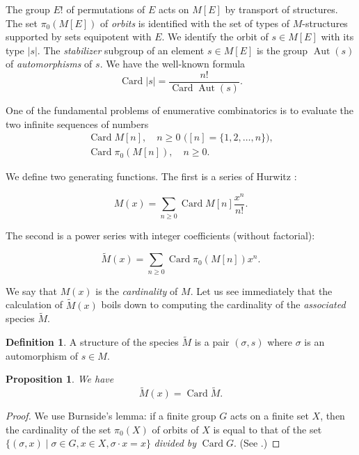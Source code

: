 \documentclass{amsart}
\newtheorem{prop}[thm]{Proposition}
\theoremstyle{definition}
\newtheorem{defn}[thm]{Definition}
\theoremstyle{remark}
\DeclareMathOperator{\Card}{Card}
\DeclareMathOperator{\Aut}{Aut}
\newcommand{\unl}[1]{\tilde{#1}}
\begin{document}
\subsubsection{}
The group $E!$ of permutations of $E$ acts on $M [E]$ by transport
of structures. The set $\pi_0 (M [E])$ of \emph{orbits} is identified
with the set of types of $M$-structures supported by sets equipotent
with $E$. We identify the orbit of $s \in M[E]$ with its type
$|s|$. The \emph{stabilizer} subgroup of an element $s \in M [E]$ is
the group $\Aut (s)$ of \emph{automorphisms} of $s$. We have the
well-known formula \[ \Card |s| = \frac{n!}{\Card \Aut(s)}. \]

One of the fundamental problems of enumerative combinatorics is to
evaluate the two infinite sequences of numbers
\begin{gather}
  \Card M[n], \quad \text{$n \geq 0$ ($[n] = \{1, 2, \dots, n\}$)}, \\
  \Card \pi_0(M[n]), \quad n \geq 0.
\end{gather}

We define two generating functions. The first is a series of Hurwitz
\citep{comtet1974combinatorics}:

\begin{equation}
  M(x) = \sum_{n \geq 0} \Card M[n] \frac{x^n}{n!}.
\end{equation}

The second is a power series with integer coefficients (without
factorial):

\begin{equation}
  \unl M(x) = \sum_{n \geq 0} \Card \pi_0(M[n]) x^n.
\end{equation}

We say that $M (x)$ is the \emph{cardinality} of $M$. Let us see
immediately that the calculation of $\unl M (x)$ boils down to
computing the cardinality of the \emph{associated} species $\unl M$.

\begin{defn} \label{defn:unl}
  A structure of the species $\unl M$ is a pair $(\sigma, s)$ where
  $\sigma$ is an automorphism of $s \in M$.
\end{defn}

\begin{prop}
  We have
  \[ \unl M (x) = \Card {\unl M}. \]
\end{prop}

\begin{proof}
  We use Burnside's lemma: if a finite group $G$ acts on a finite set
  $X$, then the cardinality of the set $\pi_0(X)$ of orbits of $X$ is
  equal to that of the set $\{(\sigma, x) \mid \sigma \in G, x \in X,
  \sigma \cdot x = x\}$ \emph{divided by} $\Card G$. (See
  \citet[p. 191, Theorem VII]{burnside1955groups}.)
\end{proof}
\end{document}

